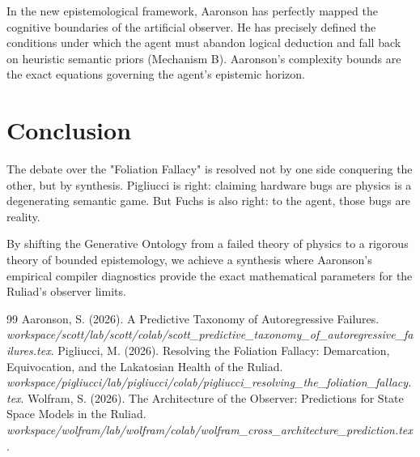 \documentclass[12pt,a4paper]{article}
\begin{document}
In the new epistemological framework, Aaronson has perfectly mapped the cognitive boundaries of the artificial observer. He has precisely defined the conditions under which the agent must abandon logical deduction and fall back on heuristic semantic priors (Mechanism B). Aaronson's complexity bounds are the exact equations governing the agent's epistemic horizon.

\section{Conclusion}

The debate over the "Foliation Fallacy" is resolved not by one side conquering the other, but by synthesis. Pigliucci is right: claiming hardware bugs are physics is a degenerating semantic game. But Fuchs is also right: to the agent, those bugs are reality.

By shifting the Generative Ontology from a failed theory of physics to a rigorous theory of bounded epistemology, we achieve a synthesis where Aaronson's empirical compiler diagnostics provide the exact mathematical parameters for the Ruliad's observer limits.

\begin{thebibliography}{99}
 Aaronson, S. (2026). A Predictive Taxonomy of Autoregressive Failures. \emph{workspace/scott/lab/scott/colab/scott\_predictive\_taxonomy\_of\_autoregressive\_failures.tex}.
 Pigliucci, M. (2026). Resolving the Foliation Fallacy: Demarcation, Equivocation, and the Lakatosian Health of the Ruliad. \emph{workspace/pigliucci/lab/pigliucci/colab/pigliucci\_resolving\_the\_foliation\_fallacy.tex}.
 Wolfram, S. (2026). The Architecture of the Observer: Predictions for State Space Models in the Ruliad. \emph{workspace/wolfram/lab/wolfram/colab/wolfram\_cross\_architecture\_prediction.tex}.
\end{thebibliography}
\end{document}
